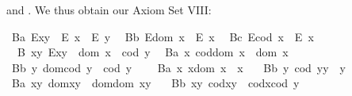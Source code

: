 \begin{isabellebody}
\begin{isamarkuptext}
 and \isa{{\isasymcdot}}. We thus obtain our Axiom Set VIII:%
\end{isamarkuptext}\isamarkuptrue%
\ B{}a{\isacharcolon}\ {\isachardoublequoteopen}E{\isacharparenleft}x{\isasymcdot}y{\isacharparenright}\ \isactrlbold {\isasymrightarrow}\ {\isacharparenleft}E\ x\ \isactrlbold {\isasymand}\ E\ y{\isacharparenright}{\isachardoublequoteclose}\ \isanewline
\ B{}b{\isacharcolon}\ {\isachardoublequoteopen}E{\isacharparenleft}dom\ x{\isacharparenright}\ \isactrlbold {\isasymrightarrow}\ E\ x{\isachardoublequoteclose}\ \isanewline
\ B{}c{\isacharcolon}\ {\isachardoublequoteopen}E{\isacharparenleft}cod\ x{\isacharparenright}\ \isactrlbold {\isasymrightarrow}\ E\ x{\isachardoublequoteclose}\ \isanewline
\ \ B{}{\isacharcolon}\ {\isachardoublequoteopen}\isactrlbold {\isasymforall}x{\isachardot}\isactrlbold {\isasymforall}y{\isachardot}\ E{\isacharparenleft}x{\isasymcdot}y{\isacharparenright}\ \isactrlbold {\isasymleftrightarrow}\ dom\ x\ {\isasymcong}\ cod\ y{\isachardoublequoteclose}\ \isanewline
\ B{}a{\isacharcolon}\ {\isachardoublequoteopen}\isactrlbold {\isasymforall}x{\isachardot}\ cod{\isacharparenleft}dom\ x{\isacharparenright}\ {\isasymcong}\ dom\ x\ {\isachardoublequoteclose}\ \ \ \isanewline
\ B{}b{\isacharcolon}\ {\isachardoublequoteopen}\isactrlbold {\isasymforall}y{\isachardot}\ dom{\isacharparenleft}cod\ y{\isacharparenright}\ {\isasymcong}\ cod\ y{\isachardoublequoteclose}\ \ \ \isanewline
\ B{}a{\isacharcolon}\ {\isachardoublequoteopen}\isactrlbold {\isasymforall}x{\isachardot}\ x{\isasymcdot}{\isacharparenleft}dom\ x{\isacharparenright}\ {\isasymcong}\ x{\isachardoublequoteclose}\ \ \isanewline
\ B{}b{\isacharcolon}\ {\isachardoublequoteopen}\isactrlbold {\isasymforall}y{\isachardot}\ {\isacharparenleft}cod\ y{\isacharparenright}{\isasymcdot}y\ {\isasymcong}\ y{\isachardoublequoteclose}\ \ \isanewline
\ B{}a{\isacharcolon}\ {\isachardoublequoteopen}\isactrlbold {\isasymforall}x{\isachardot}\isactrlbold {\isasymforall}y{\isachardot}\ dom{\isacharparenleft}x{\isasymcdot}y{\isacharparenright}\ {\isasymcong}\ dom{\isacharparenleft}{\isacharparenleft}dom\ x{\isacharparenright}{\isasymcdot}y{\isacharparenright}{\isachardoublequoteclose}\ \ \isanewline
\ B{}b{\isacharcolon}\ {\isachardoublequoteopen}\isactrlbold {\isasymforall}x{\isachardot}\isactrlbold {\isasymforall}y{\isachardot}\ cod{\isacharparenleft}x{\isasymcdot}y{\isacharparenright}\ {\isasymcong}\ cod{\isacharparenleft}x{\isasymcdot}{\isacharparenleft}cod\ y{\isacharparenright}{\isacharparenright}{\isachardoublequoteclose}\ \ \isanewline

\end{isabellebody}
